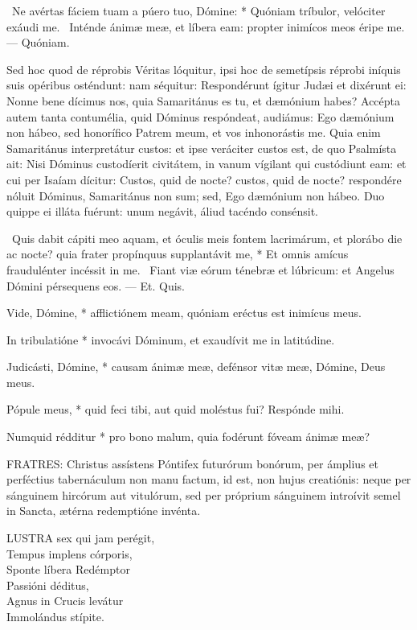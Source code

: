 \R\ Ne avértas fáciem tuam a púero tuo, Dómine: * Quóniam tríbulor, velóciter exáudi me. \V\ Inténde ánimæ meæ, et líbera eam: propter inimícos meos éripe me. --- Quóniam.

Sed hoc quod de réprobis Véritas lóquitur, ipsi hoc de semetípsis réprobi iníquis suis opéribus osténdunt: nam séquitur: Respondérunt ígitur Judæi et dixérunt ei: Nonne bene dícimus nos, quia Samaritánus es tu, et dæmónium habes? Accépta autem tanta contumélia, quid Dóminus respóndeat, audiámus: Ego dæmónium non hábeo, sed honorífico Patrem meum, et vos inhonorástis me. Quia enim Samaritánus interpretátur custos: et ipse veráciter custos est, de quo Psalmísta ait: Nisi Dóminus custodíerit civitátem, in vanum vígilant qui custódiunt eam: et cui per Isaíam dícitur: Custos, quid de nocte? custos, quid de nocte? respondére nóluit Dóminus, Samaritánus non sum; sed, Ego dæmónium non hábeo. Duo quippe ei illáta fuérunt: unum negávit, áliud tacéndo consénsit.

\R\ Quis dabit cápiti meo aquam, et óculis meis fontem lacrimárum, et plorábo die ac nocte? quia frater propínquus supplantávit me, * Et omnis amícus fraudulénter incéssit in me. \V\ Fiant viæ eórum ténebræ et lúbricum: et Angelus Dómini pérsequens eos. --- Et. Quis.


 Vide, Dómine, * afflictiónem meam, quóniam eréctus est inimícus meus.


 In tribulatióne * invocávi Dóminum, et exaudívit me in latitúdine.

 Judicásti, Dómine, * causam ánimæ meæ, defénsor vitæ meæ, Dómine, Deus meus.

 Pópule meus, * quid feci tibi, aut quid moléstus fui? Respónde mihi.

 Numquid rédditur * pro bono malum, quia fodérunt fóveam ánimæ meæ?


\lettrine[lines=2]{F}{RATRES}: Christus assístens Póntifex futurórum bonórum, per ámplius et perféctius tabernáculum non manu factum, id est, non hujus creatiónis: neque per sánguinem hircórum aut vitulórum, sed per próprium sánguinem introívit semel in Sancta, ætérna redemptióne invénta.


\lettrine[lines=2]{L}{USTRA} sex qui jam perégit,\\
Tempus implens córporis,\\
Sponte líbera Redémptor\\
Passióni déditus,\\
Agnus in Crucis levátur\\
Immolándus stípite.

